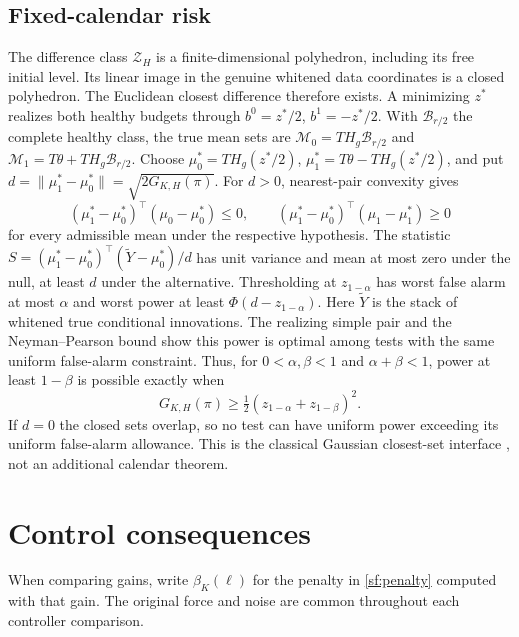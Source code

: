 \documentclass[journal]{IEEEtran}
\begin{document}
\subsection{Fixed-calendar risk}\label{sf:risk}
The difference class $\mathcal Z_H$ is a finite-dimensional polyhedron, including
its free initial level. Its linear image in the genuine whitened data coordinates
is a closed polyhedron. The Euclidean closest difference therefore exists.
A minimizing $z^*$ realizes both healthy budgets through
$b^0=z^*/2$, $b^1=-z^*/2$. With $\mathcal B_{r/2}$ the complete healthy class,
the true mean sets are $\mathcal M_0=T H_g\mathcal B_{r/2}$ and
$\mathcal M_1=T \theta+T H_g\mathcal B_{r/2}$.
Choose $\mu_0^*=T H_g(z^*/2)$, $\mu_1^*=T \theta-T H_g(z^*/2)$, and put
$d=\|\mu_1^*-\mu_0^*\|=\sqrt{2G_{K,H}(\pi)}$.
For $d>0$, nearest-pair convexity gives
\[
(\mu_1^*-\mu_0^*)^\top(\mu_0-\mu_0^*)\le0,\qquad
(\mu_1^*-\mu_0^*)^\top(\mu_1-\mu_1^*)\ge0
\]
for every admissible mean under the respective hypothesis.
The statistic
$S=(\mu_1^*-\mu_0^*)^\top(\widetilde Y-\mu_0^*)/d$
has unit variance and mean at most zero under the null, at least $d$ under
the alternative. Thresholding at $z_{1-\alpha}$ has worst false alarm
at most $\alpha$ and worst power at least
$\Phi(d-z_{1-\alpha})$.
Here $\widetilde Y$ is the stack of whitened true conditional innovations.
The realizing simple pair and the Neyman--Pearson bound show this power is
optimal among tests with the same uniform false-alarm constraint.
Thus, for $0<\alpha,\beta<1$ and $\alpha+\beta<1$, power at least
$1-\beta$ is possible exactly when
\[
G_{K,H}(\pi)\ge\tfrac12(z_{1-\alpha}+z_{1-\beta})^2.
\]
If $d=0$ the closed sets overlap, so no test can have uniform power exceeding
its uniform false-alarm allowance. This is the classical Gaussian closest-set
interface \cite{convex}, not an additional calendar theorem.
\section{Control consequences}\label{sf:control}
When comparing gains, write $\beta_K(\ell)$ for the penalty in
\eqref{sf:penalty} computed with that gain. The original force and noise
are common throughout each controller comparison.
\end{document}
